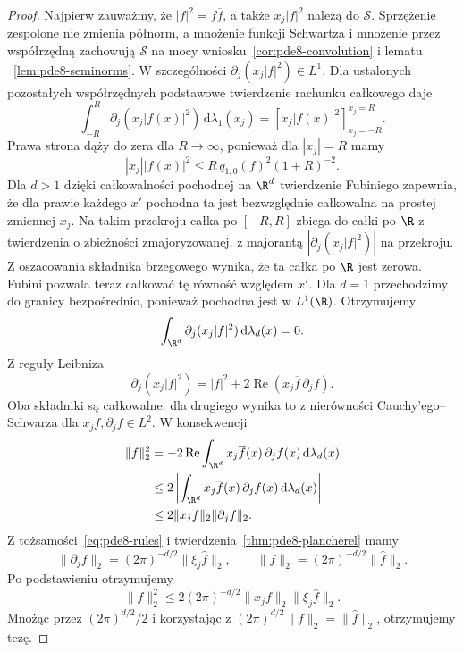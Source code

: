 \begin{proof}
Najpierw zauważmy, że $|f|^2=f\overline f$,
a także $x_j|f|^2$ należą do $\mathcal S$.
Sprzężenie zespolone nie zmienia półnorm,
a mnożenie funkcji Schwartza i mnożenie przez
współrzędną zachowują $\mathcal S$ na mocy
wniosku~\ref{cor:pde8-convolution} i lematu
~\ref{lem:pde8-seminorms}.
W szczególności $\partial_j(x_j|f|^2)\in L^1$.
Dla ustalonych pozostałych współrzędnych
podstawowe twierdzenie rachunku całkowego daje
\[
 \int_{-R}^R\partial_j(x_j|f(x)|^2)
 \,\mathrm d\lambda_1(x_j)
 =\left[x_j|f(x)|^2\right]_{x_j=-R}^{x_j=R}.
\]
Prawa strona dąży do zera dla $R\to\infty$,
ponieważ dla $|x_j|=R$ mamy
\[
 |x_j||f(x)|^2
 \le R\,q_{1,0}(f)^2(1+R)^{-2}.
\]
Dla $d>1$ dzięki całkowalności pochodnej
na $\R^d$ twierdzenie Fubiniego zapewnia, że
dla prawie każdego $x'$ pochodna ta jest
bezwzględnie całkowalna na prostej zmiennej $x_j$.
Na takim przekroju całka po $[-R,R]$ zbiega
do całki po $\R$ z twierdzenia o zbieżności
zmajoryzowanej, z majorantą
$|\partial_j(x_j|f|^2)|$ na przekroju.
Z oszacowania składnika brzegowego wynika,
że ta całka po $\R$ jest zerowa. Fubini
pozwala teraz całkować tę równość względem $x'$.
Dla $d=1$ przechodzimy do granicy bezpośrednio,
ponieważ pochodna jest w $L^1(\R)$.
Otrzymujemy
\[
 \int_{\R^d}\partial_j(x_j|f|^2)
 \,\mathrm d\lambda_d(x)=0.
\]
Z reguły Leibniza
\[
 \partial_j(x_j|f|^2)
 =|f|^2+2\operatorname{Re}(x_j\overline f\,\partial_j f).
\]
Oba składniki są całkowalne: dla drugiego
wynika to z nierówności Cauchy'ego--Schwarza
dla $x_jf,\partial_j f\in L^2$.
W konsekwencji
\[
 \begin{aligned}
 \|f\|_2^2
 &=-2\operatorname{Re}
 \int_{\R^d}x_j\overline f(x)\,\partial_j f(x)
 \,\mathrm d\lambda_d(x)\\
 &\le 2\left|
 \int_{\R^d}x_j\overline f(x)\,\partial_j f(x)
 \,\mathrm d\lambda_d(x)\right|\\
 &\le 2\|x_j f\|_2\|\partial_j f\|_2.
 \end{aligned}
\]
Z tożsamości~\eqref{eq:pde8-rules}
i twierdzenia~\ref{thm:pde8-plancherel} mamy
\[
 \|\partial_j f\|_2
 =(2\pi)^{-d/2}\|\xi_j\widehat f\|_2,
 \qquad
 \|f\|_2=(2\pi)^{-d/2}\|\widehat f\|_2.
\]
Po podstawieniu otrzymujemy
\[
 \|f\|_2^2\le
 2(2\pi)^{-d/2}\|x_jf\|_2\|\xi_j\widehat f\|_2.
\]
Mnożąc przez $(2\pi)^{d/2}/2$ i korzystając
z $(2\pi)^{d/2}\|f\|_2=\|\widehat f\|_2$,
otrzymujemy tezę.


\end{proof}

